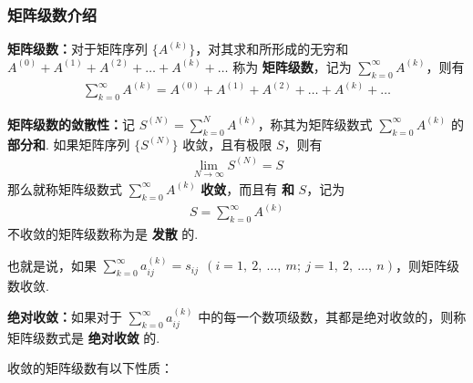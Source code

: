         \subsubsection{矩阵级数介绍}
            \par \textbf{矩阵级数：}对于矩阵序列 $\{A^{(k)}\}$，对其求和所形成的无穷和 $A^{(0)} + A^{(1)} + A^{(2)} + \dots + A^{(k)} + \dots$ 称为 \textbf{矩阵级数}，记为 $\sum_{k=0}^{\infty}A^{(k)}$，则有
            \begin{align*}
                \sum_{k=0}^{\infty}A^{(k)} = A^{(0)} + A^{(1)} + A^{(2)} + \dots + A^{(k)} + \dots
            \end{align*}
            \par \textbf{矩阵级数的敛散性：}记 $S^{(N)} = \sum_{k=0}^{N}A^{(k)}$，称其为矩阵级数式 $\sum_{k=0}^{\infty}A^{(k)}$ 的 \textbf{部分和}. 如果矩阵序列 $\{S^{(N)}\}$ 收敛，且有极限 $S$，则有 
            \begin{align*}
                \lim_{N \rightarrow \infty}S^{(N)} = S
            \end{align*}    
            那么就称矩阵级数式 $\sum_{k=0}^{\infty}A^{(k)}$ \textbf{收敛}，而且有 \textbf{和} $S$，记为 
            \begin{align*}
                S = \sum_{k=0}^{\infty}A^{(k)}
            \end{align*}
            不收敛的矩阵级数称为是 \textbf{发散} 的.
            \par 也就是说，如果 $\sum_{k=0}^{\infty}a_{ij}^{(k)} = s_{ij} \ \ (i = 1, \ 2, \ \dots, \ m; \ j = 1, \ 2, \ \dots, \ n)$，则矩阵级数收敛.
            \par \textbf{绝对收敛：}如果对于 $\sum_{k=0}^{\infty}a_{ij}^{(k)}$ 中的每一个数项级数，其都是绝对收敛的，则称矩阵级数式是 \textbf{绝对收敛} 的.
            \par 收敛的矩阵级数有以下性质：
